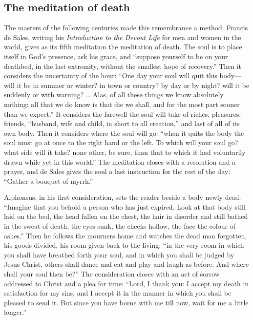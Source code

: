 \subsection{The meditation of death}

The masters of the following centuries made this remembrance a method. Francis de Sales, writing his \emph{Introduction to the Devout Life} for men and women in the world, gives as its fifth meditation the meditation of death. The soul is to place itself in God's presence, ask his grace, and ``suppose yourself to be on your deathbed, in the last extremity, without the smallest hope of recovery.'' Then it considers the uncertainty of the hour: ``One day your soul will quit this body---will it be in summer or winter? in town or country? by day or by night? will it be suddenly or with warning? \ldots{} Alas, of all these things we know absolutely nothing: all that we do know is that die we shall, and for the most part sooner than we expect.'' It considers the farewell the soul will take of riches, pleasures, friends, ``husband, wife and child, in short to all creation,'' and last of all of its own body. Then it considers where the soul will go: ``when it quits the body the soul must go at once to the right hand or the left. To which will your soul go? what side will it take? none other, be sure, than that to which it had voluntarily drawn while yet in this world.'' The meditation closes with a resolution and a prayer, and de Sales gives the soul a last instruction for the rest of the day: ``Gather a bouquet of myrrh.''

Alphonsus, in his first consideration, sets the reader beside a body newly dead. ``Imagine that you behold a person who has just expired. Look at that body still laid on the bed, the head fallen on the chest, the hair in disorder and still bathed in the sweat of death, the eyes sunk, the cheeks hollow, the face the colour of ashes.'' Then he follows the mourners home and watches the dead man forgotten, his goods divided, his room given back to the living: ``in the very room in which you shall have breathed forth your soul, and in which you shall be judged by Jesus Christ, others shall dance and eat and play and laugh as before. And where shall your soul then be?'' The consideration closes with an act of sorrow addressed to Christ and a plea for time: ``Lord, I thank you: I accept my death in satisfaction for my sins, and I accept it in the manner in which you shall be pleased to send it. But since you have borne with me till now, wait for me a little longer.''

